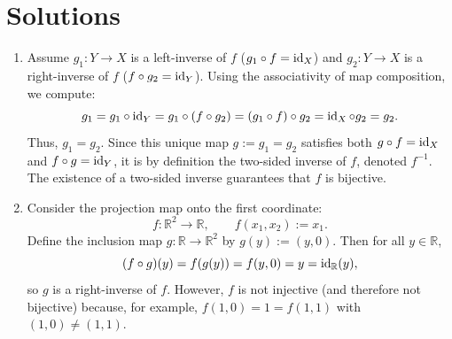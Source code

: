 \section{Solutions}\label{sec:solutions_maps}

\begin{exercisesolution}
\label{sol:left_right_inverses}
\begin{enumerate}[label=\textbf{(\alph*)}]
    \item Assume $g_1 \colon Y \to X$ is a left-inverse of $f$ ($g_1 \circ f = \operatorname{id}_X$) and $g_2 \colon Y \to X$ is a right-inverse of $f$ ($f \circ g_2 = \operatorname{id}_Y$). Using the associativity of map composition, we compute:
    \[
    g_1 = g_1 \circ \operatorname{id}_Y = g_1 \circ (f \circ g_2) = (g_1 \circ f) \circ g_2 = \operatorname{id}_X \circ g_2 = g_2.
    \]
    Thus, $g_1 = g_2$. Since this unique map $g := g_1 = g_2$ satisfies both $g \circ f = \operatorname{id}_X$ and $f \circ g = \operatorname{id}_Y$, it is by definition the two-sided inverse of $f$, denoted $f^{-1}$. The existence of a two-sided inverse guarantees that $f$ is bijective.

    \item Consider the projection map onto the first coordinate:
    \[
    f \colon \mathbb{R}^2 \longrightarrow \mathbb{R}, \qquad f(x_1, x_2) := x_1.
    \]
    Define the inclusion map $g \colon \mathbb{R} \to \mathbb{R}^2$ by $g(y) := (y, 0)$. Then for all $y \in \mathbb{R}$,
    \[
    (f \circ g)(y) = f(g(y)) = f(y, 0) = y = \operatorname{id}_{\mathbb{R}}(y),
    \]
    so $g$ is a right-inverse of $f$. However, $f$ is not injective (and therefore not bijective) because, for example, $f(1, 0) = 1 = f(1, 1)$ with $(1, 0) \ne (1, 1)$.
\end{enumerate}
\end{exercisesolution}

